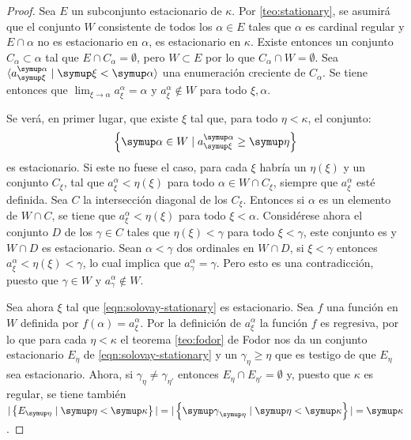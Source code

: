 \newcommand{\seqa}{a_\xi^\alpha}
\begin{proof}
    Sea $E$ un subconjunto estacionario de $\kappa$.
    Por \ref{teo:stationary}, se asumirá que el conjunto $W$
    consistente de todos los $\alpha\in E$ tales que $\alpha$ es cardinal
    regular y $E\cap\alpha$ no es estacionario en $\alpha$, es estacionario en $\kappa$.
    Existe entonces un conjunto \cna{} $C_\alpha\subset\alpha$ tal que $E\cap C_\alpha = \emptyset$,
    pero $W\subset E$ por lo que $C_\alpha\cap W=\emptyset$.
    Sea $\seq{\seqa\mid\xi<\alpha}$ una enumeración creciente de $C_\alpha$.
    Se tiene entonces que $\lim_{\xi\to\alpha}\seqa = \alpha$ y $\seqa\notin W$ para todo $\xi, \alpha$.

    Se verá, en primer lugar, que existe $\xi$ tal que, para todo $\eta<\kappa$, el conjunto:
    \begin{equation}\label{eqn:solovay-stationary}
        \set{\alpha\in W\mid \seqa\geq\eta}
    \end{equation}
    es estacionario. Si este no fuese el caso, para cada $\xi$ habría un $\eta(\xi)$
    y un conjunto \cna{} $C_\xi$, tal que $\seqa < \eta(\xi)$ para todo $\alpha\in W\cap C_\xi$, siempre que $\seqa$
    esté definida. Sea $C$ la intersección diagonal de los $C_\xi$. Entonces si $\alpha$ es un elemento de
    $W\cap C$, se tiene que $\seqa < \eta(\xi)$ para todo $\xi<\alpha$. Considérese ahora el conjunto $D$ de
    los $\gamma\in C$ tales que $\eta(\xi)<\gamma$ para todo $\xi<\gamma$, este conjunto es \cna{}
    y $W\cap D$ es estacionario. Sean $\alpha<\gamma$ dos ordinales en $W\cap D$,
    si $\xi<\gamma$ entonces $\seqa<\eta(\xi)<\gamma$, lo cual implica que $a_\gamma^\alpha = \gamma$.
    Pero esto es una contradicción, puesto que $\gamma\in W$ y $a_\gamma^\alpha\notin W$.

    Sea ahora $\xi$ tal que \ref{eqn:solovay-stationary} es estacionario.
    Sea $f$ una función en $W$ definida por $f(\alpha)=\seqa$. Por la definición de $\seqa$
    la función $f$ es regresiva, por lo que para cada $\eta<\kappa$ el teorema \ref{teo:fodor} de Fodor
    nos da un conjunto estacionario $E_\eta$ de \ref{eqn:solovay-stationary} y un $\gamma_\eta\geq\eta$
    que es testigo de que $E_\eta$ sea estacionario.
    Ahora, si $\gamma_\eta\neq\gamma_{\eta'}$ entonces $E_\eta\cap E_{\eta'} = \emptyset$ y, puesto que $\kappa$ es regular,
    se tiene también $|\set{E_\eta\mid\eta<\kappa}| = |\set{\gamma_\eta\mid\eta<\kappa}| = \kappa$.
\end{proof}

